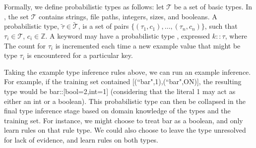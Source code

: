 Formally, we define probabilistic types as follows: let $\mathcal{T}$ be a set of basic types.
In \app, the set $\mathcal{T}$ contains strings, file paths, integers, sizes, and booleans. 
A probabilistic type, $\tilde{\tau} \in \tilde{\mathcal{T}}$, is a set of pairs $\{(\tau_1, c_1),\ldots,(\tau_n, c_n)\}$, such that $\tau_i \in \mathcal{T}$, $c_i \in \mathbb{Z}$. 
A keyword may have a probabilistic type , expressed $k::\tau$, where 
The count for $\tau_i$ is incremented each time a new example value that might be type $\tau_i$ is encountered for a particular key.


Taking the example type inference rules above, we can run an example inference.
For example, if the training set contained [(``bar",1),(``bar",ON)], the resulting type would be bar::[bool=2,int=1] (considering that the literal 1 may act as either an int or a boolean).
This probabilistic type can then be collapsed in the final type inference stage based on domain knowledge of the types and the training set.
For instance, we might choose to treat bar as a boolean, and only learn rules on that rule type.
We could also choose to leave the type unresolved for lack of evidence, and learn rules on both types.

